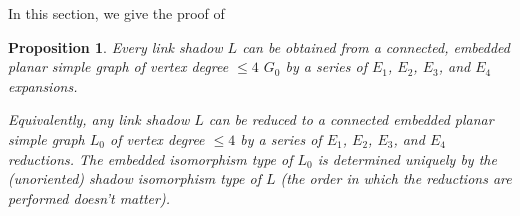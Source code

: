 \documentclass[amsmath,secnumarabic,floatfix,amssymb,nofootinbib,nobibnotes,letterpaper,11pt,tightenlines,showkeys]{revtex4}
\newtheorem{proposition}[theorem]{Proposition}
\theoremstyle{definition}
\newcommand{\loopinsert}{E_1}
\newcommand{\edgedouble}{E_2}
\newcommand{\cutedgedouble}{E_3}
\newcommand{\pairinsert}{E_4}
\begin{document}
In this section, we give the proof of 

\setcounter{theorem}{16}

\begin{proposition}
Every link shadow $L$ can be obtained from a connected, embedded planar simple graph of vertex degree $\leq 4$ $G_0$ by a series of $\loopinsert$, $\edgedouble$, $\cutedgedouble$, and $\pairinsert$ expansions.

Equivalently, any link shadow $L$ can be reduced to a connected embedded planar simple graph $L_0$ of vertex degree $\leq 4$ by a series of $\loopinsert$, $\edgedouble$, $\cutedgedouble$, and $\pairinsert$ reductions. The embedded isomorphism type of $L_0$ is determined uniquely by the (unoriented) shadow isomorphism type of $L$ (the order in which the reductions are performed doesn't matter).
\end{proposition}
\end{document}
